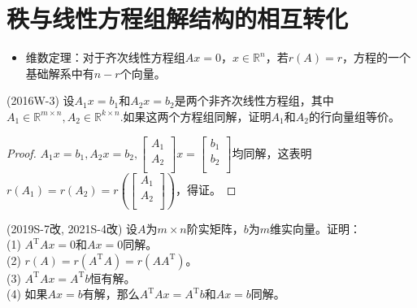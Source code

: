 \documentclass[lang=cn,newtx,10pt,scheme=chinese]{elegantbook}
\begin{document}
\section{秩与线性方程组解结构的相互转化}

\begin{itemize}
    \item 维数定理：对于齐次线性方程组$Ax = 0$，$x \in \mathbb{R}^n$，若$r(A) = r$，方程的一个基础解系中有$n-r$个向量。
\end{itemize}

\begin{example}
    (2016W-3) 设$A_1 x = b_1$和$A_2 x = b_2$是两个非齐次线性方程组，其中$A_1 \in \mathbb{R}^{m \times n}, A_2 \in \mathbb{R}^{k \times n}$.如果这两个方程组同解，证明$A_1$和$A_2$的行向量组等价。
\end{example}

\begin{proof}
    $A_1 x = b_1,A_2 x = b_2,
    \left[
    \begin{matrix}
        A_1 \\
        A_2 \\
    \end{matrix}
    \right]x=
    \left[
    \begin{matrix}
        b_1 \\
        b_2 \\
    \end{matrix}
    \right]
    $均同解，这表明$r(A_1) = r(A_2) = r\left(
    \left[
    \begin{matrix}
        A_1 \\
        A_2 \\
    \end{matrix}
    \right]
    \right)
    $，得证。
\end{proof}

\begin{example}
    (2019S-7改, 2021S-4改) 设$A$为$m \times n$阶实矩阵，$b$为$m$维实向量。证明：\\
    (1) $A^\mathrm{T} A x = 0$和$A x = 0$同解。\\
    (2) $r(A) = r(A^\mathrm{T} A) = r(A A^\mathrm{T})$。\\
    (3) $A^\mathrm{T} A x = A^\mathrm{T}b$恒有解。\\
    (4) 如果$A x = b$有解，那么$A^\mathrm{T} A x = A^\mathrm{T} b$和$A x = b$同解。
\end{example}
\end{document}
